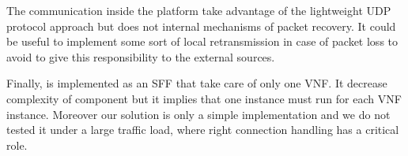 The communication inside the platform take advantage of the lightweight UDP
protocol approach but does not internal mechanisms of packet recovery. It could
be useful to implement some sort of local retransmission in case of packet loss
to avoid to give this responsibility to the external sources.

Finally, \astaire{} is implemented as an SFF that take care of only one VNF. It
decrease complexity of component but it implies that one \astaire{} instance
must run for each VNF instance. Moreover our solution is only a simple
implementation and we do not tested it under a large traffic load, where right
connection handling has a critical role.

